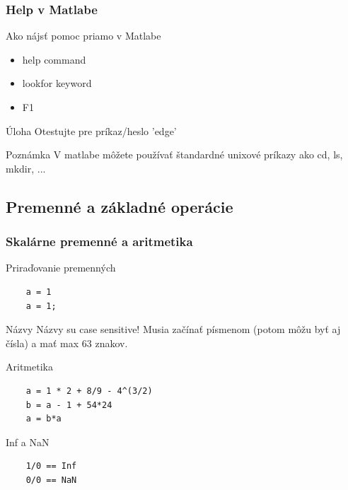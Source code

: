 \documentclass{beamer}
\begin{document}
\begin{frame}
\frametitle{Help v Matlabe}
  \begin{block}{Ako nájsť pomoc priamo v Matlabe}
  \begin{itemize}
    \item help command
    \item lookfor keyword
    \item F1
  \end{itemize}
  \end{block}

  \begin{alertblock}{Úloha}
    Otestujte pre príkaz/heslo 'edge'
  \end{alertblock}
  
  \begin{block}{Poznámka}
    V matlabe môžete používať štandardné unixové príkazy ako cd, ls, mkdir, ...
  \end{block}
\end{frame}

\subsection{Premenné a základné operácie}

\begin{frame}[fragile]
\frametitle{Skalárne premenné a aritmetika}

  \begin{block}{Priraďovanie premenných}
  \begin{verbatim}
    a = 1
    a = 1;  \end{verbatim}
  \end{block}
  
  \pause
  
  \begin{alertblock}{Názvy}
    Názvy su case sensitive! Musia začínať písmenom (potom môžu byť aj čísla) a mať max 63 znakov.
  \end{alertblock}
  
  \pause
  
  \begin{block}{Aritmetika}
  \begin{verbatim}
    a = 1 * 2 + 8/9 - 4^(3/2)
    b = a - 1 + 54*24
    a = b*a  \end{verbatim}
  \end{block}
  
  \pause
  
  \begin{alertblock}{Inf a NaN}
  \begin{verbatim}
    1/0 == Inf
    0/0 == NaN  \end{verbatim}
  \end{alertblock}
\end{frame}
\end{document}
